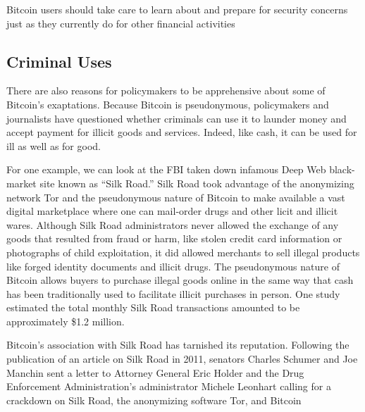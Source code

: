 Bitcoin users should take
care to learn about and prepare for security concerns just as they
currently do for other financial activities

\subsection{Criminal Uses}

There are also reasons for policymakers to be apprehensive
about some of Bitcoin’s exaptations. Because Bitcoin is pseudonymous,
policymakers and journalists have questioned whether
criminals can use it to launder money and accept payment for
illicit goods and services. Indeed, like cash, it can be used for ill
as well as for good.

For one example, we can look at the FBI taken down infamous Deep Web
black-market site known as “Silk Road.” Silk Road took advantage
of the anonymizing network Tor and the pseudonymous
nature of Bitcoin to make available a vast digital marketplace
where one can mail-order drugs and other licit and illicit wares.
Although Silk Road administrators never allowed the exchange
of any goods that resulted from fraud or harm, like stolen credit
card information or photographs of child exploitation, it did
allowed merchants to sell illegal products like forged identity documents
and illicit drugs. The pseudonymous nature of Bitcoin
allows buyers to purchase illegal goods online in the same way
that cash has been traditionally used to facilitate illicit purchases
in person. One study estimated the total monthly Silk Road
transactions amounted to be approximately \$1.2 million.

Bitcoin’s association with Silk Road has tarnished its reputation.
Following the publication of an article on Silk Road in 2011, senators Charles Schumer and Joe Manchin sent a letter
to Attorney General Eric Holder and the Drug Enforcement
Administration’s administrator Michele Leonhart calling for
a crackdown on Silk Road, the anonymizing software Tor, and
Bitcoin


